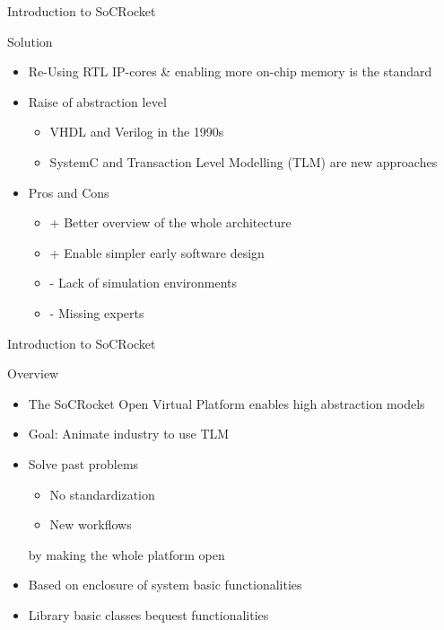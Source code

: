\begin{frame}{Introduction to SoCRocket}
\begin{block}{Solution}
  \begin{itemize}
		\item	Re-Using RTL IP-cores \& enabling more on-chip memory is the standard 
		\item Raise of abstraction level
			\begin{itemize}
				\item VHDL and Verilog in the 1990s
				\item	SystemC and Transaction Level Modelling (TLM) are new approaches
			\end{itemize}
		\item Pros and Cons
			\begin{itemize}
				\item + Better overview of the whole architecture
				\item + Enable simpler early software design
				\item - Lack of simulation environments
				\item - Missing experts
			\end{itemize}
		\end{itemize}
\end{block}
\end{frame}


\begin{frame}{Introduction to SoCRocket}
\begin{block}{Overview}
  \begin{itemize}
		\item The SoCRocket Open Virtual Platform enables high abstraction models
		\item Goal: Animate industry to use TLM
		\item Solve past problems 
			\begin{itemize}
				\item No standardization
				\item New workflows
			\end{itemize} 
			by making the whole platform open
		\item Based on enclosure of system basic functionalities 
		\item Library basic classes bequest functionalities
	\end{itemize}
\end{block}
\end{frame}


